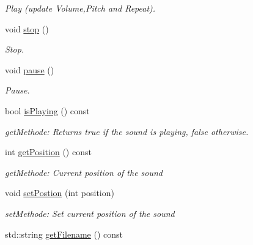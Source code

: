 \begin{DoxyCompactItemize}
\begin{DoxyCompactList}\small\item\em Play (update Volume,Pitch and Repeat). \item\end{DoxyCompactList}\item 
\hypertarget{class_f2_c_1_1_audio_file_a561e9174955aceab50247cd78a4f4b06}{
void \hyperlink{class_f2_c_1_1_audio_file_a561e9174955aceab50247cd78a4f4b06}{stop} ()}
\label{class_f2_c_1_1_audio_file_a561e9174955aceab50247cd78a4f4b06}

\begin{DoxyCompactList}\small\item\em Stop. \item\end{DoxyCompactList}\item 
\hypertarget{class_f2_c_1_1_audio_file_a12916f619b8aec5d7598cb4c0440a586}{
void \hyperlink{class_f2_c_1_1_audio_file_a12916f619b8aec5d7598cb4c0440a586}{pause} ()}
\label{class_f2_c_1_1_audio_file_a12916f619b8aec5d7598cb4c0440a586}

\begin{DoxyCompactList}\small\item\em Pause. \item\end{DoxyCompactList}\item 
\hypertarget{class_f2_c_1_1_audio_file_a68c97a63861927e7099bfa87848ef781}{
bool \hyperlink{class_f2_c_1_1_audio_file_a68c97a63861927e7099bfa87848ef781}{isPlaying} () const }
\label{class_f2_c_1_1_audio_file_a68c97a63861927e7099bfa87848ef781}

\begin{DoxyCompactList}\small\item\em getMethode: Returns true if the sound is playing, false otherwise. \item\end{DoxyCompactList}\item 
\hypertarget{class_f2_c_1_1_audio_file_a0e1914642d211c376f53d207d6d5ec5b}{
int \hyperlink{class_f2_c_1_1_audio_file_a0e1914642d211c376f53d207d6d5ec5b}{getPosition} () const }
\label{class_f2_c_1_1_audio_file_a0e1914642d211c376f53d207d6d5ec5b}

\begin{DoxyCompactList}\small\item\em getMethode: Current position of the sound \item\end{DoxyCompactList}\item 
void \hyperlink{class_f2_c_1_1_audio_file_a0883e1dcba9286eba384507752007eed}{setPostion} (int position)
\begin{DoxyCompactList}\small\item\em setMethode: Set current position of the sound \item\end{DoxyCompactList}\item 
\hypertarget{class_f2_c_1_1_audio_file_aab2fd2600fd2282972b73b5f5fd60b4b}{
std::string \hyperlink{class_f2_c_1_1_audio_file_aab2fd2600fd2282972b73b5f5fd60b4b}{getFilename} () const }
\label{class_f2_c_1_1_audio_file_aab2fd2600fd2282972b73b5f5fd60b4b}


\end{DoxyCompactItemize}
